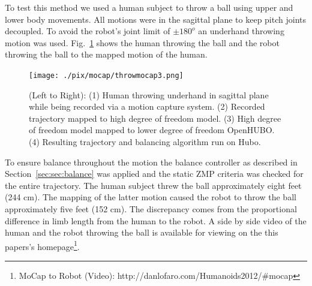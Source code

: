To test this method we used a human subject to throw a ball using upper and lower body movements.  
All motions were in the sagittal plane to keep pitch joints decoupled.  
To avoid the robot's joint limit of $\pm180^o$ an underhand throwing motion was used.
Fig.~\ref{fig:mocap-underhand} shows the human throwing the ball and the robot throwing the ball to the mapped motion of the human.

\begin{figure}[t]
  \centering
\texttt{[image: ./pix/mocap/throwmocap3.png]}
  \caption{(Left to Right): (1) Human throwing underhand in sagittal plane while being recorded via a motion capture system.  (2) Recorded trajectory mapped to high degree of freedom model.  (3) High degree of freedom model mapped to lower degree of freedom OpenHUBO.  (4) Resulting trajectory and balancing algorithm run on Hubo.\cite{lofaroURAI}}
  \label{fig:mocap-underhand}
\end{figure}

To ensure balance throughout the motion the balance controller as described in Section~\ref{sec:sec:balance} was applied and the static ZMP criteria was checked for the entire trajectory.
The human subject threw the ball approximately eight feet (244 cm).  
The mapping of the latter motion caused the robot to throw the ball approximately five feet (152 cm).
The discrepancy comes from the proportional difference in limb length from the human to the robot.
A side by side video of the human and the robot throwing the ball is available for viewing on the this papers's homepage\footnote{MoCap to Robot (Video): http://danlofaro.com/Humanoids2012/\#mocap}.




